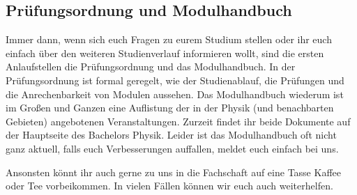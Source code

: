 \vspace{2mm}

\subsection{Prüfungsordnung und Modulhandbuch}

\begin{figure*}[b]
\end{figure*}

Immer dann, wenn sich euch Fragen zu eurem Studium stellen oder ihr euch einfach über den weiteren Studienverlauf informieren wollt, sind die ersten Anlaufstellen die Prüfungsordnung und das Modulhandbuch. In der Prüfungsordnung ist formal geregelt, wie der Studienablauf, die Prüfungen und die Anrechenbarkeit von Modulen aussehen. Das Modulhandbuch wiederum ist im Großen und Ganzen eine Auflistung der in der Physik (und benachbarten Gebieten) angebotenen Veranstaltungen. Zurzeit findet ihr beide Dokumente auf der Hauptseite des Bachelors Physik. Leider ist das Modulhandbuch oft nicht ganz aktuell, falls euch Verbesserungen auffallen, meldet euch einfach bei uns.

Ansonsten könnt ihr auch gerne zu uns in die Fachschaft auf eine Tasse Kaffee oder Tee vorbeikommen. In vielen Fällen können wir euch auch weiterhelfen.